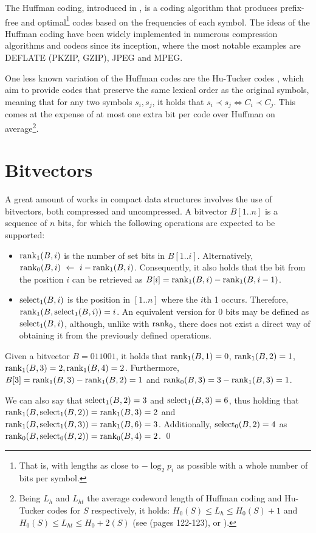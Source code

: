 \documentclass[a4paper,10pt,twoside]{book}
\begin{document}
	The Huffman coding, introduced in \cite{huffman1952method}, is a coding algorithm that produces prefix-free and optimal\footnote{That is, with lengths as close to $-\log_2p_i$ as possible with a whole number of bits per symbol.} codes based on the frequencies of each symbol. The ideas of the Huffman coding have been widely implemented in numerous compression algorithms and codecs since its inception, where the most notable examples are DEFLATE (PKZIP, GZIP), JPEG and MPEG.
	
	One less known variation of the Huffman codes are the Hu-Tucker codes \cite{hu1971optimal}, which aim to provide codes that preserve the same lexical order as the original symbols, meaning that for any two symbols $s_i,s_j$, it holds that $s_i \prec s_j \iff C_i \prec C_j$. This comes at the expense of at most one extra bit per code over Huffman on average\footnote{Being $L_h$ and $L_{ht}$ the average codeword 
	length of Huffman coding and Hu-Tucker codes for $S$ respectively, it holds: $H_0(S) \leq L_h \leq H_0(S)+1$ and $H_0(S) \leq L_{ht} \leq H_0+2(S)$
	(see \cite{Cover:2006:EIT:1146355} (pages 122-123), or \cite{HORIBE1977148, GilbertandMore1959}).}.
	
	\section{Bitvectors}
	\label{sec:bit}
	A great amount of works in compact data structures involves the use of bitvectors, both compressed and uncompressed. A bitvector $B[1..n]$ is a sequence of $n$ bits, for which the following operations are expected to be supported:

    \begin{itemize}
        \item $\operatorname{rank}_1(B,i)$ is the number of set bits in $B[1..i]$. Alternatively, $\operatorname{rank}_0(B,i)~\leftarrow~i - \operatorname{rank}_1(B,i)$. Consequently, it also holds that the bit from the position $i$ can be retrieved as $B[i] = \operatorname{rank}_1(B,i) - \operatorname{rank}_1(B,i-1)$.
        \item $\operatorname{select}_1(B,i)$ is the position in $[1..n]$ where the $i$th 1 occurs. Therefore, $\operatorname{rank}_1(B,\operatorname{select}_1(B,i)) = i$. An equivalent version for 0 bits may be defined as $\operatorname{select}_1(B,i)$, although, unlike with $\operatorname{rank}_0$, there does not exist a direct way of obtaining it from the previously defined operations.
    \end{itemize}
    
    \begin{example}
        Given a bitvector $B = 011001$, it holds that $\operatorname{rank}_1(B,1) = 0$, $\operatorname{rank}_1(B,2) = 1$, $\operatorname{rank}_1(B,3) = 2, \operatorname{rank}_1(B,4) = 2$. Furthermore, $B[3] = \operatorname{rank}_1(B,3) - \operatorname{rank}_1(B,2) = 1$ and $\operatorname{rank}_0(B,3) = 3 - \operatorname{rank}_1(B,3) = 1$.
        
        We can also say that $\operatorname{select}_1(B,2) = 3$ and $\operatorname{select}_1(B,3) = 6$, thus holding that $\operatorname{rank}_1(B,\operatorname{select}_1(B,2)) = \operatorname{rank}_1(B,3) = 2$ and $\operatorname{rank}_1(B,\operatorname{select}_1(B,3)) = \operatorname{rank}_1(B,6) = 3$. Additionally, $\operatorname{select}_0(B,2) = 4$ as $\operatorname{rank}_0(B,\operatorname{select}_0(B,2)) = \operatorname{rank}_0(B,4) = 2$.
        \qed
    \end{example}
    
\end{document}
